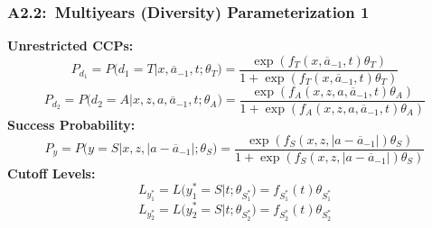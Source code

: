 \documentclass[12pt, aspectratio=169]{beamer}
\begin{document}
\begin{frame}[label=mdp1]
\frametitle{A2.2:\ Multiyears (Diversity) Parameterization 1}
\textbf{Unrestricted CCPs:}
\begin{equation*}
P_{d_1} = P\big(d_1=T\big|x,\overline{a}_{-1},t;\theta_T\big) = \frac{\exp(f_T(x,\overline{a}_{-1},t)\theta_T)}{1+\exp(f_T(x,\overline{a}_{-1},t)\theta_T)}
\end{equation*}
\begin{equation*}
P_{d_2} = P\big(d_2=A\big|x,z,a,\overline{a}_{-1},t;\theta_A\big) = \frac{\exp(f_A(x,z,a,\overline{a}_{-1},t)\theta_A)}{1+\exp(f_A(x,z,a,\overline{a}_{-1},t)\theta_A)}
\end{equation*}
\textbf{Success Probability:}
\begin{equation*}
P_y = P\big(y = S\big|x,z,|a-\overline{a}_{-1}|;\theta_S\big) = \frac{\exp(f_S(x,z,|a-\overline{a}_{-1}|)\theta_S)}{1+\exp(f_S(x,z,|a-\overline{a}_{-1}|)\theta_S)}
\end{equation*}
\textbf{Cutoff Levels:}
\begin{equation*}
L_{y_1^*} = L\big(y_1^* = S\big|t;\theta_{S_1^*}\big) = f_{S_1^*}(t)\theta_{S_1^*}
\end{equation*}
\begin{equation*}
L_{y_2^*} = L\big(y_2^* = S\big|t;\theta_{S_2^*}\big) = f_{S_2^*}(t)\theta_{S_2^*}
\end{equation*}
\hyperlink{conc}{}
\end{frame}
\end{document}
